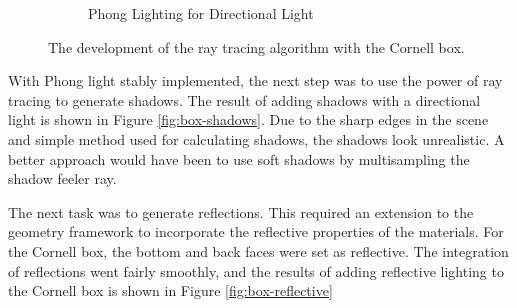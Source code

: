 \documentclass[letterpaper, 11pt, onecolumn, oneside]{article}
\begin{document}
\begin{figure}
\begin{subfigure}{.3\textwidth}
      \caption{Phong Lighting for Directional Light}
      \label{fig:box-phong}
    \end{subfigure}
    \caption{The development of the ray tracing algorithm with the Cornell box.}
    \end{figure}

    With Phong light stably implemented, the next step was to use the power of ray tracing to generate shadows.
    The result of adding shadows with a directional light is shown in Figure \ref{fig:box-shadows}.
    Due to the sharp edges in the scene and simple method used for calculating shadows, the shadows look unrealistic.
    A better approach would have been to use soft shadows by multisampling the shadow feeler ray.

    The next task was to generate reflections.
    This required an extension to the geometry framework to incorporate the reflective properties of the materials.
    For the Cornell box, the bottom and back faces were set as reflective.
    The integration of reflections went fairly smoothly, and the results of adding reflective lighting to the Cornell box is shown in Figure \ref{fig:box-reflective}
\end{document}

